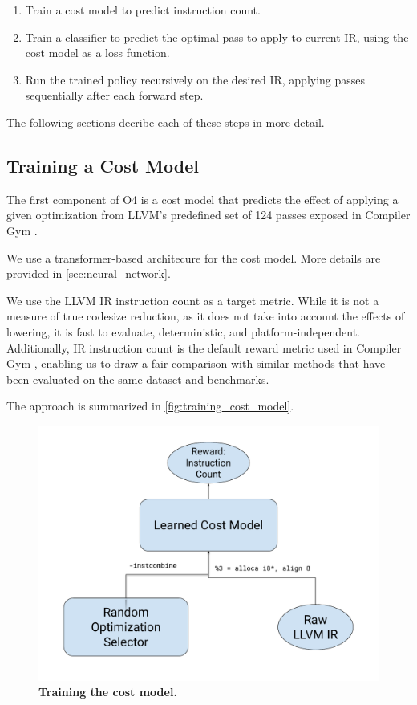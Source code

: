 \documentclass[conference]{IEEEtran}
\begin{document}
\begin{enumerate}
  \item Train a cost model to predict instruction count.
  \item Train a classifier to predict the optimal pass to apply to current IR,
        using the cost model as a loss function.
  \item Run the trained policy recursively on the desired IR, applying passes
        sequentially after each forward step.
\end{enumerate}

The following sections decribe each of these steps in more detail.

\subsection{Training a Cost Model}

The first component of O4 is a cost model that predicts the effect of applying a
given optimization from LLVM's predefined set of 124 passes exposed in Compiler
Gym \cite{CompilerGym}.

We use a transformer-based architecure for the cost model. More details are
provided in \ref{sec:neural_network}.

We use the LLVM IR instruction count as a target metric. While it is not a
measure of true codesize reduction, as it does not take into account the effects
of lowering, it is fast to evaluate, deterministic, and platform-independent.
Additionally, IR instruction count is the default reward metric used in Compiler
Gym \cite{CompilerGym}, enabling us to draw a fair comparison with similar
methods that have been evaluated on the same dataset and benchmarks.


The approach is summarized in \ref{fig:training_cost_model}.

\label{fig:training_cost_model}
\begin{figure}
  \centering
  \includegraphics[scale=0.3]{figures/training_1.pdf}
  \caption{\textbf{Training the cost model.}}
\end{figure}
\end{document}
